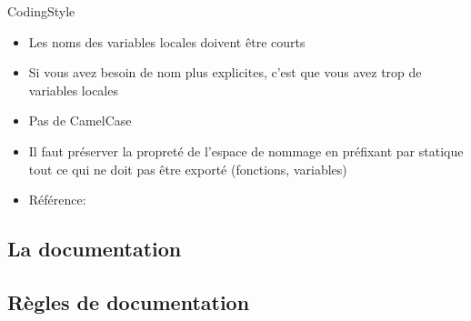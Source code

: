 \begin{frame}[fragile=singleslide]{CodingStyle}
  \begin{itemize} 
  \item Les noms des variables locales doivent être courts
  \item Si  vous avez  besoin de nom  plus explicites, c'est  que vous
    avez trop de variables locales
  \item Pas de CamelCase
  \item  Il faut  préserver  la  propreté de  l'espace  de nommage  en
    préfixant  par statique  tout ce  qui  ne doit  pas être  exporté
    (fonctions, variables)
  \item Référence: 
  \end{itemize} 
\end{frame} 

\subsection{La documentation}

\subsection{Règles de documentation}


